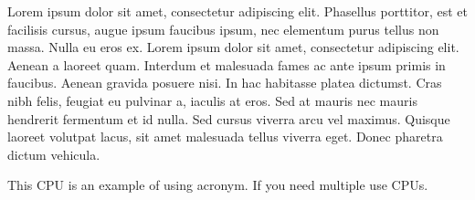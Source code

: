 Lorem ipsum dolor sit amet, consectetur adipiscing elit. Phasellus porttitor, est et facilisis cursus, augue ipsum faucibus ipsum, nec elementum purus tellus non massa. Nulla eu eros ex. Lorem ipsum dolor sit amet, consectetur adipiscing elit. Aenean a laoreet quam. Interdum et malesuada fames ac ante ipsum primis in faucibus. Aenean gravida posuere nisi. In hac habitasse platea dictumst. Cras nibh felis, feugiat eu pulvinar a, iaculis at eros. Sed at mauris nec mauris hendrerit fermentum et id nulla. Sed cursus viverra arcu vel maximus. Quisque laoreet volutpat lacus, sit amet malesuada tellus viverra eget. Donec pharetra dictum vehicula. \cite{interpretation-of-Computer-Programs}

This \ac{CPU} is an example of using acronym. If you need multiple use \acp{CPU}.